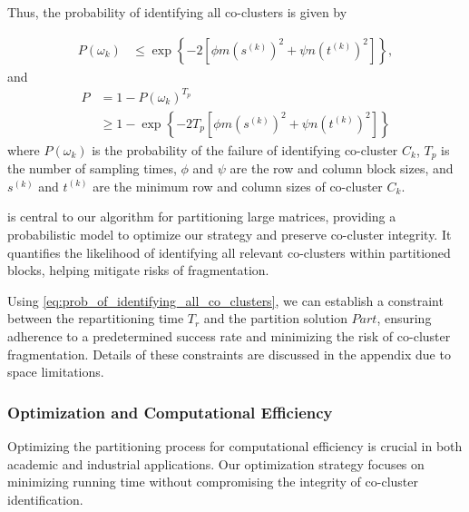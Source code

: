 
Thus, the probability of identifying all co-clusters is given by

\begin{equation}
    \begin{split}
        P(\omega_k) & \le \exp \left\{ -2 [\phi m (s^{(k)})^2 + \psi n (t^{(k)})^2] \right\},
    \end{split}
\end{equation}
and
\begin{equation}
    \begin{split}
        P & = 1 - P(\omega_k)^{T_p}                                                                                                       \\
          & \ge 1 - \exp \left\{ -2 T_p [\phi m (s^{(k)})^2 + \psi n (t^{(k)})^2] \right\} \label{eq:prob_of_identifying_all_co_clusters}
    \end{split}
\end{equation}
where $P(\omega_k)$ is the probability of the failure of identifying co-cluster $C_k$, $T_p$ is the number of sampling times, $\phi$ and $\psi$ are the row and column block sizes, and $s^{(k)}$ and $t^{(k)}$ are the minimum row and column sizes of co-cluster $C_k$.

 is central to our algorithm for partitioning large matrices, providing a probabilistic model to optimize our strategy and preserve co-cluster integrity. It quantifies the likelihood of identifying all relevant co-clusters within partitioned blocks, helping mitigate risks of fragmentation.

Using \eqref{eq:prob_of_identifying_all_co_clusters}, we can establish a constraint between the repartitioning time $T_r$ and the partition solution $Part$, ensuring adherence to a predetermined success rate and minimizing the risk of co-cluster fragmentation. Details of these constraints are discussed in the appendix due to space limitations.

\subsubsection{Optimization and Computational Efficiency}
Optimizing the partitioning process for computational efficiency is crucial in both academic and industrial applications. Our optimization strategy focuses on minimizing running time without compromising the integrity of co-cluster identification.

